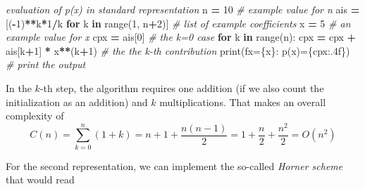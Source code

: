 \documentclass[
]{book}
\newenvironment{Shaded}{\begin{snugshade}}{\end{snugshade}}
\newcommand{\BuiltInTok}[1]{#1}
\newcommand{\CommentTok}[1]{\textcolor[rgb]{0.56,0.35,0.01}{\textit{#1}}}
\newcommand{\ControlFlowTok}[1]{\textcolor[rgb]{0.13,0.29,0.53}{\textbf{#1}}}
\newcommand{\DecValTok}[1]{\textcolor[rgb]{0.00,0.00,0.81}{#1}}
\newcommand{\KeywordTok}[1]{\textcolor[rgb]{0.13,0.29,0.53}{\textbf{#1}}}
\newcommand{\NormalTok}[1]{#1}
\newcommand{\OperatorTok}[1]{\textcolor[rgb]{0.81,0.36,0.00}{\textbf{#1}}}
\newcommand{\SpecialCharTok}[1]{\textcolor[rgb]{0.00,0.00,0.00}{#1}}
\newcommand{\SpecialStringTok}[1]{\textcolor[rgb]{0.31,0.60,0.02}{#1}}
\theoremstyle{definition}
\theoremstyle{definition}
\theoremstyle{definition}
\theoremstyle{definition}
\theoremstyle{remark}
\begin{document}
\begin{Shaded}
\begin{Highlighting}[]
\CommentTok{\textquotesingle{}\textquotesingle{}\textquotesingle{}evaluation of p(x) in standard representation}
\CommentTok{\textquotesingle{}\textquotesingle{}\textquotesingle{}}
\NormalTok{n }\OperatorTok{=} \DecValTok{10}                                      \CommentTok{\# example value for n}
\NormalTok{ais }\OperatorTok{=}\NormalTok{ [(}\OperatorTok{{-}}\DecValTok{1}\NormalTok{)}\OperatorTok{**}\NormalTok{k}\OperatorTok{*}\DecValTok{1}\OperatorTok{/}\NormalTok{k }\ControlFlowTok{for}\NormalTok{ k }\KeywordTok{in} \BuiltInTok{range}\NormalTok{(}\DecValTok{1}\NormalTok{, n}\OperatorTok{+}\DecValTok{2}\NormalTok{)]  }\CommentTok{\# list of example coefficients}
\NormalTok{x }\OperatorTok{=} \DecValTok{5}                                       \CommentTok{\# an example value for x}
\NormalTok{cpx }\OperatorTok{=}\NormalTok{ ais[}\DecValTok{0}\NormalTok{]                                }\CommentTok{\# the k=0 case}
\ControlFlowTok{for}\NormalTok{ k }\KeywordTok{in} \BuiltInTok{range}\NormalTok{(n):}
\NormalTok{    cpx }\OperatorTok{=}\NormalTok{ cpx }\OperatorTok{+}\NormalTok{ ais[k}\OperatorTok{+}\DecValTok{1}\NormalTok{] }\OperatorTok{*}\NormalTok{ x}\OperatorTok{**}\NormalTok{(k}\OperatorTok{+}\DecValTok{1}\NormalTok{)         }\CommentTok{\# the the k{-}th contribution}
\BuiltInTok{print}\NormalTok{(}\SpecialStringTok{f\textquotesingle{}x=}\SpecialCharTok{\{x\}}\SpecialStringTok{: p(x)=}\SpecialCharTok{\{}\NormalTok{cpx}\SpecialCharTok{:.4f\}}\SpecialStringTok{\textquotesingle{}}\NormalTok{)             }\CommentTok{\# print the output }
\end{Highlighting}
\end{Shaded}

In the \(k\)-th step, the algorithm requires one addition (if we also count the initialization as an addition) and \(k\) multiplications. That makes an overall complexity of
\begin{equation*}
C(n) = \sum_{k=0}^n(1+k) = n+1 + \frac{n(n-1)}{2} = 1 + \frac n2 + \frac{n^2}2 = O(n^2)
\end{equation*}

For the second representation, we can implement the so-called \emph{Horner scheme} that would read
\end{document}

